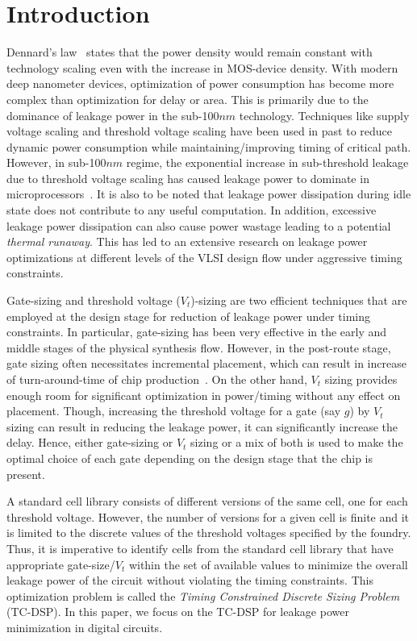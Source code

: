 \section{Introduction}
\label{sec:introduction}

\noindent Dennard's law~\cite{dennard:74} states that the power density would remain constant with technology scaling even with the increase in MOS-device density.  With modern deep nanometer devices, optimization of power consumption has become more complex than optimization for delay or area. This is primarily due to the dominance of leakage power in the sub-100$n$$m$ technology. Techniques like supply voltage scaling and threshold voltage scaling have been used in past to reduce dynamic power consumption while maintaining/improving timing of critical path. However, in sub-100$n$$m$ regime, the exponential increase in sub-threshold leakage due to  threshold voltage scaling has caused leakage power to dominate in microprocessors~\cite{borkar:99,kim:03}. It is also to be noted that leakage power dissipation during idle state does not contribute to any useful computation. In addition, excessive leakage power dissipation can also cause power wastage leading to a  potential {\em thermal runaway}\cite{virat}. This has led to an extensive research on leakage power optimizations at different levels of the VLSI design flow under aggressive timing constraints. 

\noindent Gate-sizing and threshold voltage ($V_t$)-sizing are two efficient techniques that are employed at the design stage for reduction of leakage power under timing constraints. In particular, gate-sizing has been very effective in the early and middle stages of the physical synthesis flow.
% 
% 
However, in the post-route stage, gate sizing often necessitates 
incremental placement, which can result in increase of turn-around-time of chip production~\cite{feng:09}. On the other hand, $V_t$ sizing provides enough room for significant optimization in power/timing without any effect on placement. Though, increasing the threshold voltage for a gate (say $g$) by  $V_t$ sizing can result in reducing the leakage power, it can significantly increase the delay. Hence, either gate-sizing or $V_t$ sizing or a mix of both is used to make the optimal choice of each gate depending on the design stage that the chip is present\cite{virat}.

\noindent A standard cell library consists of different versions of the same cell, one for each threshold voltage. However, the number of versions for a given cell is finite and it is limited to the discrete values of the threshold voltages specified by the foundry. Thus, it is imperative to identify cells from the standard cell library that have appropriate gate-size/$V_t$ within the set of available values to minimize the overall leakage power of the circuit without violating the timing constraints.
This optimization problem is called the {\em Timing Constrained Discrete Sizing Problem} (TC-DSP). In this paper, we focus on the TC-DSP for leakage power minimization in digital circuits. 

